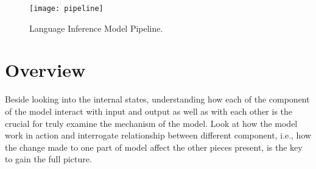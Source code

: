 \begin{figure}[htbp]
\centering
\vspace{-2mm}
 \texttt{[image: pipeline]}
 \caption{Language Inference Model Pipeline.}
\label{fig:modelPipeline}
\end{figure}

\section{Overview}
Beside looking into the internal states, understanding how each of the component of the model interact with input and output as well as with each other is the crucial for truly examine the mechanism of the model.
%
Look at how the model work in action and interrogate relationship between different component, i.e., how the change made to one part of model affect the other pieces present, is the key to gain the full picture.
